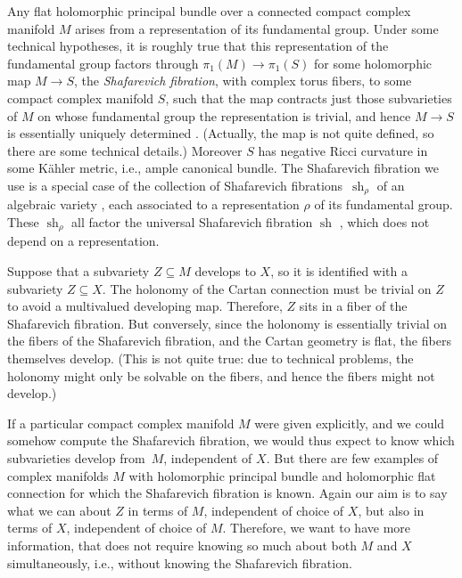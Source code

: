 \documentclass[pdftex]{sigma}
\numberwithin{equation}{section}
\begin{document}
Any flat holomorphic principal bundle over a connected compact complex manifold $M$ arises from a representation of its fundamental
group. Under some technical hypotheses, it is roughly true that this representation of the fundamental group factors through
$\pi_1(M) \to \pi_1(S)$ for some holomorphic map $M \to S$, the \emph{Shafarevich fibration}, with complex torus fibers, to some compact
complex manifold $S$, such that the map contracts just those subvarieties of $M$ on whose fundamental group the representation is
trivial, and hence $M\to S$ is essentially uniquely determined \cite{Kollar:1993,Zuo:1999}. (Actually, the map is not quite
defined, so there are some technical details.) Moreover $S$ has negative Ricci curvature in some K\"ahler metric, i.e., ample canonical
bundle.
The Shafarevich fibration we use is a special case of the collection of Shafarevich fibrations~$\operatorname{sh}_{\rho}$ of an algebraic variety \cite[p.~6]{Zuo:1999}, each associated to a representation $\rho$ of its fundamental group.
These $\operatorname{sh}_{\rho}$ all factor the universal Shafarevich fibration $\operatorname{sh}$ \cite[Definition 1]{Zuo:1999}, which does not depend on a representation.

Suppose that a subvariety $Z \subseteq M$ develops to $X$, so it is identified with a subvariety $Z \subseteq X$.
The holonomy of the Cartan connection must be trivial on $Z$ to avoid a multivalued developing map.
Therefore, $Z$ sits in a fiber of the Shafarevich fibration.
But conversely, since the holonomy is essentially trivial on the fibers of the Shafarevich fibration, and the Cartan geometry is
flat, the fibers themselves develop.
(This is not quite true: due to technical problems, the holonomy might only be solvable on the fibers, and hence the fibers might not develop.)

If a particular compact complex manifold $M$ were given explicitly, and we could somehow compute the Shafarevich fibration, we would
thus expect to know which subvarieties develop from~$M$, independent of $X$. But there are few examples of complex manifolds $M$
with holomorphic principal bundle and holomorphic flat connection for which the Shafarevich fibration is known. Again our aim is to say
what we can about $Z$ in terms of $M$, independent of choice of $X$, but also in terms of $X$, independent of choice of $M$.
Therefore, we want to have more information, that does not require knowing so much about both $M$ and $X$ simultaneously,
i.e., without knowing the Shafarevich fibration.
\end{document}
